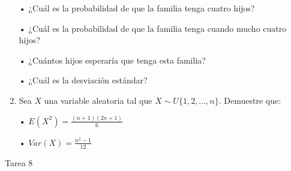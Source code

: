 \documentclass[a4paper, 12pt]{article}
\newcommand{\Pspace}{0.5cm}
\newcommand{\Aspace}{0.2cm}
\begin{document}
\begin{enumerate}
    \vspace{\Aspace} \par
    • ¿Cuál es la probabilidad de que la familia tenga cuatro hijos?
    \\ { \color{azul}  }

    \vspace{\Aspace} \par
    • ¿Cuál es la probabilidad de que la familia tenga cuando mucho cuatro hijos?
    \\ { \color{azul}  }

    \vspace{\Aspace} \par
    • ¿Cuántos hijos esperaría que tenga esta familia?
    \\ { \color{azul}  }

    \vspace{\Aspace} \par
    • ¿Cuál es la desviación estándar?
    \\ { \color{azul}  }


    \vspace{\Pspace}
    \item Sea $X$ una variable aleatoria tal que $ X \sim U\{1, 2, \dots, n\} $. Demuestre que:
    \vspace{\Aspace} \par
    • $E(X^{2}) = \frac{(n + 1)(2n + 1)}{6}$
    \\ { \color{azul}  }

    \vspace{\Aspace} \par
    • $Var(X) = \frac{n^{2} - 1}{12}$ 
    \\ { \color{azul}  }
\end{enumerate}



\newpage
\begin{center}
    { \LARGE Tarea 8}
\end{center}
\end{document}
